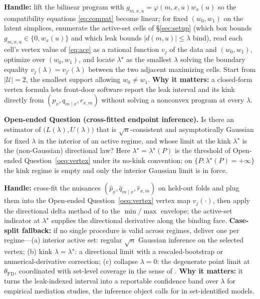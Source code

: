 \documentclass[11pt]{article}
\theoremstyle{definition}
\theoremstyle{plain}
\theoremstyle{remark}
\begin{document}
\smallskip\noindent\textbf{Handle:} lift the bilinear program with $g_{m,x,u}=\varphi(m,x,u)w_x(u)$ so the
compatibility equations \eqref{eq:compat} become linear; for fixed $(w_0,w_1)$ on the latent simplices,
enumerate the active-set cells of \S\ref{sec:setup} (which box bounds $g_{m,x,u}\in\{0,w_x(u)\}$ and which
leak bounds $|d(m,u)|\le\lambda$ bind), read each cell's vertex value of \eqref{eq:ace} as a rational
function $v_j$ of the data and $(w_0,w_1)$, optimize over $(w_0,w_1)$, and locate $\lambda^\star$ as the
smallest $\lambda$ solving the boundary equality $v_{j}(\lambda)=v_{j'}(\lambda)$ between the two adjacent
maximizing cells. Start from $|\mathcal U|=2$, the smallest support allowing $w_0\neq w_1$.
\textbf{Why it matters:} a closed-form vertex formula lets front-door software report the leak interval and
its kink directly from $(p_x,q_{m\mid x},r_{x,m})$ without solving a nonconvex program at every $\lambda$.

\label{oeq:inference}
\noindent\textbf{Open-ended Question  (cross-fitted endpoint inference).}
Is there an estimator of $\bigl(L(\lambda),U(\lambda)\bigr)$ that is $\sqrt n$-consistent and asymptotically
Gaussian for fixed $\lambda$ in the interior of an active regime, and whose limit at the kink $\lambda^\star$
is the (non-Gaussian) directional law? Here $\lambda^\star=\lambda^\star(P)$ is the threshold of Open-ended
Question~\ref{oeq:vertex} under its no-kink convention; on $\{P:\lambda^\star(P)=+\infty\}$ the kink regime is
empty and only the interior Gaussian limit is in force.

\smallskip\noindent\textbf{Handle:} cross-fit the nuisances $(\hat p_x,\hat q_{m\mid x},\hat r_{x,m})$ on
held-out folds and plug them into the Open-ended Question~\ref{oeq:vertex} vertex map
$v_j(\cdot)$, then apply the directional delta method of \citet{FangSantos2019DirectionallyDifferentiable} to
the $\min/\max$ envelope; the active-set indicator at $\lambda^\star$ supplies the directional derivative
along the binding face.
\textbf{Case-split fallback:} if no single procedure is valid across regimes, deliver one per regime---(a)
interior active set: regular $\sqrt n$ Gaussian inference on the selected vertex; (b) kink
$\lambda=\lambda^\star$: a directional limit with a rescaled-bootstrap or numerical-derivative correction; (c)
collapse $\lambda=0$: the degenerate point limit at $\theta_{\mathrm{FD}}$, coordinated with set-level
coverage in the sense of \citet{ChernozhukovHongTamer2007ParameterSets}.
\textbf{Why it matters:} it turns the leak-indexed interval into a reportable confidence band over
$\lambda$ for empirical mediation studies, the inference object \citet{ChernozhukovHongTamer2007ParameterSets}
calls for in set-identified models.
\end{document}
